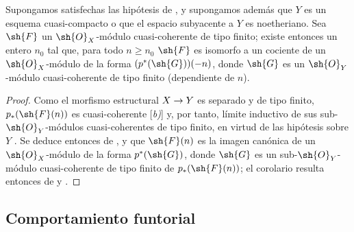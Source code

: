 \documentclass[oneside,10pt]{amsart}
\makeatletter
\renewcommand{\geq}{\geqslant}
\newcommand{\ega@arrow}[2]{\mathchoice{#1}{#2}{#2}{#2}}
\renewcommand{\to}{\ega@arrow{\longrightarrow}{\rightarrow}}
\let\EGAOriginalLabel\label
\renewcommand{\label}[1]{\phantomsection\EGAOriginalLabel{#1}}
\makeatother
\begin{document}
\begin{corollary}[3.4.8]
\label{II.3.4.8}
Supongamos satisfechas las hipótesis de , y supongamos además que $Y$ es un esquema cuasi-compacto o que el espacio subyacente a $Y$ es noetheriano.
Sea $\sh{F}$ un $\sh{O}_X$-módulo cuasi-coherente de tipo finito; existe entonces un entero $n_0$ tal que, para todo $n\geq n_0$ $\sh{F}$ es isomorfo a un cociente de un $\sh{O}_X$-módulo de la forma $(p^*(\sh{G}))(-n)$, donde $\sh{G}$ es un $\sh{O}_Y$-módulo cuasi-coherente de tipo finito (dependiente de $n$).
\end{corollary}

\begin{proof}
Como el morfismo estructural $X\to Y$ es separado y de tipo finito, $p_*(\sh{F}(n))$ es cuasi-coherente [\emph{b)}] y, por tanto, límite inductivo de sus sub-$\sh{O}_Y$-módulos cuasi-coherentes de tipo finito, en virtud de las hipótesis sobre $Y$ .
Se deduce entonces de ,  y  que $\sh{F}(n)$ es la imagen canónica de un $\sh{O}_X$-módulo de la forma $p^*(\sh{G})$, donde $\sh{G}$ es un sub-$\sh{O}_Y$-módulo cuasi-coherente de tipo finito de $p_*(\sh{F}(n))$; el corolario resulta entonces de  y .
\end{proof}

\subsection{Comportamiento funtorial}
\label{subsection:II.3.5}
\end{document}
